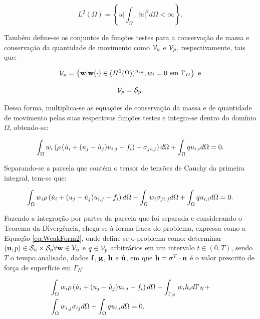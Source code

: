 \begin{equation}
    L^2(\Omega)=\left\{u|\int_\Omega{|u|^2d\Omega}<\infty\right\}\text{.}
\end{equation}

Também define-se os conjuntos de funções testes para a conservação de massa e conservação da quantidade de movimento como $\mathcal{V}_u$ e $\mathcal{V}_p$, respectivamente, tais que:

\begin{equation}
    \mathcal{V}_u=\left\{\mathbf{w}|\mathbf{w}(\cdot)\in(H^1(\Omega))^{n_{sd}},w_i=0\text{ em }\Gamma_D\right\}\text{ e}
\end{equation}

\begin{equation}
    \mathcal{V}_p=\mathcal{S}_p\text{.}
\end{equation}

Dessa forma, multiplica-se as equações de conservação da massa e de quantidade de movimento pelas suas respectivas funções testes e integra-se dentro do domínio $\Omega$, obtendo-se:

\begin{equation}
    \int_{\Omega}{w_i\left({\rho\left({\dot{u}_i+(u_j-\hat{u}_j)u_{i,j}-f_i}\right)-\sigma_{ji,j}}\right) d\Omega}+\int_{\Omega}{qu_{i,i} d\Omega}=0\text{.}
\end{equation}

Separando-se a parcela que contém o tensor de tensões de Cauchy da primeira integral, tem-se que:

\begin{equation}
    \int_{\Omega}{w_i\rho\left({\dot{u}_i+(u_j-\hat{u}_j)u_{i,j}-f_i}\right) d\Omega}-\int_{\Omega}{w_i\sigma_{ji,j} d\Omega}+\int_{\Omega}{qu_{i,i} d\Omega}=0\text{.}
    \label{eq:WeakForm1}
\end{equation}

Fazendo a integração por partes da parcela que foi separada e considerando o Teorema da Divergência, chega-se à forma fraca do problema, expressa como a Equação \ref{eq:WeakForm2}, onde define-se o problema como: determinar $(\mathbf{u},p)\in\mathcal{S}_u\times\mathcal{S}_p\forall\mathbf{w}\in\mathcal{V}_u$ e $q\in\mathcal{V}_p$ arbitrários em um intervalo $t\in(0,T)$, sendo $T$ o tempo analisado, dados $\mathbf{f}$, $\mathbf{g}$, $\mathbf{h}$ e $\hat{\mathbf{u}}$, em que $\mathbf{h}=\mathbf{\sigma}^T\cdot\mathbf{n}$ é o valor prescrito de força de superfície em $\Gamma_N$:

\begin{equation}
    \begin{split}
        &\int_{\Omega}{w_i\rho\left({\dot{u}_i+(u_j-\hat{u}_j)u_{i,j}-f_i}\right) d\Omega}-\int_{\Gamma_N}{w_ih_i d\Gamma_N}+\\
        &\int_{\Omega}{w_{i,j}\sigma_{ij} d\Omega}+\int_{\Omega}{qu_{i,i} d\Omega}=0\text{.}
    \end{split}
    \label{eq:WeakForm2}
\end{equation}


